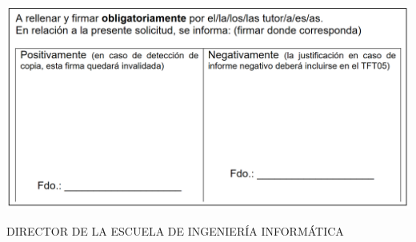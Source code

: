 \begin{center}

\includegraphics[scale=0.6]{0_frontmatter/figures/firmasTFT04.PNG}




%

\vspace{1em}

DIRECTOR DE LA ESCUELA DE INGENIERÍA INFORMÁTICA

\end{center}

\restoregeometry